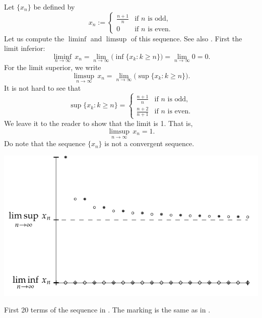 \begin{example} \label{example:liminfsupex}
Let $\{ x_n \}$ be defined by
\begin{equation*}
x_n :=
\begin{cases}
\frac{n+1}{n} & \text{if } n \text{ is odd,} \\
0             & \text{if } n \text{ is even.}
\end{cases}
\end{equation*}
Let us compute the $\liminf$ and $\limsup$ of this sequence.  See also
.  First the
limit inferior:
\begin{equation*}
\liminf_{n\to\infty} \, x_n = 
\lim_{n\to\infty}
\bigl(
\inf \{ x_k : k \geq n \}
\bigr)
=
\lim_{n\to\infty} 0 = 0 .
\end{equation*}
For the limit superior, we write
\begin{equation*}
\limsup_{n\to\infty} \, x_n = 
\lim_{n\to\infty}
\bigl(
\sup \{ x_k : k \geq n \}
\bigr) .
\end{equation*}
It is not hard to see that
\begin{equation*}
\sup \{ x_k : k \geq n \} =
\begin{cases}
\frac{n+1}{n}   & \text{if } n \text{ is odd,} \\
\frac{n+2}{n+1} & \text{if } n \text{ is even.}
\end{cases}
\end{equation*}
We leave it to the reader to show that the limit is 1.  That is,
\begin{equation*}
\limsup_{n\to\infty} \, x_n = 1 .
\end{equation*}
Do note that the sequence $\{ x_n \}$ is not a convergent sequence.
\begin{myfigureht}
\includegraphics{figures/sequence-limsupliminf_an_bn-example}
\caption{First 20 terms of the sequence in .
The marking is the same as in .
\label{sequence-limsupliminf_an_bn-example}}
\end{myfigureht}
\end{example}

